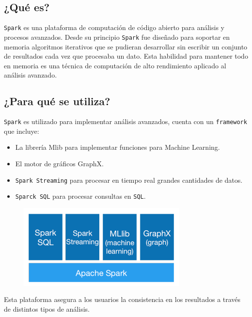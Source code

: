 \documentclass[]{article}
\begin{document}
\subsection{¿Qué es?}\label{que-es-1}

\texttt{Spark} es una plataforma de computación de código abierto para
análisis y procesos avanzados. Desde su principio \texttt{Spark} fue
diseñado para soportar en memoria algoritmos iterativos que se pudieran
desarrollar sin escribir un conjunto de resultados cada vez que
procesaba un dato. Esta habilidad para mantener todo en memoria es una
técnica de computación de alto rendimiento aplicado al análisis
avanzado.

\subsection{¿Para qué se utiliza?}\label{para-que-se-utiliza-1}

\texttt{Spark} es utilizado para implementar análisis avanzados, cuenta
con un \texttt{framework} que incluye:

\begin{itemize}
\itemsep1pt\parskip0pt
\item
  La librería Mlib para implementar funciones para Machine Learning.
\item
  El motor de gráficos GraphX.
\item
  \texttt{Spark Streaming} para procesar en tiempo real grandes
  cantidades de datos.
\item
  \texttt{Sparck SQL} para procesar consultas en \texttt{SQL}.
\end{itemize}

\begin{figure}[H]
\centering
\includegraphics[width=0.8 \textwidth]{img/spark2.png}
\end{figure}

Esta plataforma asegura a los usuarios la consistencia en los resultados
a través de distintos tipos de análisis.
\end{document}
